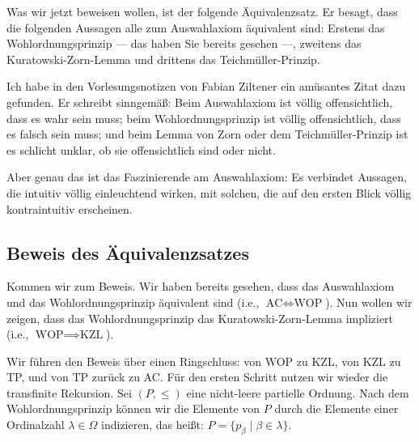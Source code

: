 \begin{spoken-clean}[01:08:33 - 01:10:28]
Was wir jetzt beweisen wollen, ist der folgende Äquivalenzsatz. Er besagt, dass die folgenden Aussagen alle zum Auswahlaxiom äquivalent sind: Erstens das Wohlordnungsprinzip --- das haben Sie bereits gesehen ---, zweitens das Kuratowski-Zorn-Lemma und drittens das Teichmüller-Prinzip.

Ich habe in den Vorlesungsnotizen von Fabian Ziltener ein amüsantes Zitat dazu gefunden. Er schreibt sinngemäß: Beim Auswahlaxiom ist völlig offensichtlich, dass es wahr sein muss; beim Wohlordnungsprinzip ist völlig offensichtlich, dass es falsch sein muss; und beim Lemma von Zorn oder dem Teichmüller-Prinzip ist es schlicht unklar, ob sie offensichtlich sind oder nicht.

Aber genau das ist das Faszinierende am Auswahlaxiom: Es verbindet Aussagen, die intuitiv völlig einleuchtend wirken, mit solchen, die auf den ersten Blick völlig kontraintuitiv erscheinen.
\end{spoken-clean}

\begin{math-stroke}
\end{math-stroke}

\subsection{Beweis des Äquivalenzsatzes}

\begin{spoken-clean}[01:10:28 - 01:13:04]
Kommen wir zum Beweis. Wir haben bereits gesehen, dass das Auswahlaxiom und das Wohlordnungsprinzip äquivalent sind (i.e., $\text{AC} \iff \text{WOP}$). Nun wollen wir zeigen, dass das Wohlordnungsprinzip das Kuratowski-Zorn-Lemma impliziert (i.e., $\text{WOP} \implies \text{KZL}$).

Wir führen den Beweis über einen Ringschluss: von WOP zu KZL, von KZL zu TP, und von TP zurück zu AC. Für den ersten Schritt nutzen wir wieder die transfinite Rekursion. Sei $(P, \le)$ eine nicht-leere partielle Ordnung. Nach dem Wohlordnungsprinzip können wir die Elemente von $P$ durch die Elemente einer Ordinalzahl $\lambda \in \Omega$ indizieren, das heißt: $P = \{p_\beta \mid \beta \in \lambda\}$.
\end{spoken-clean}

